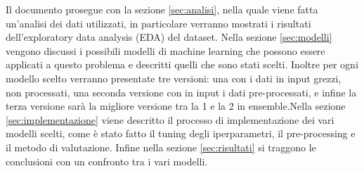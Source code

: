Il documento prosegue con la sezione \ref{sec:analisi}, nella quale viene fatta un'analisi dei dati utilizzati, in particolare verranno mostrati i risultati dell'exploratory data analysis (EDA) del dataset. Nella sezione \ref{sec:modelli} vengono discussi i possibili modelli di machine learning che possono essere applicati a questo problema e descritti quelli che sono stati scelti. Inoltre per ogni modello scelto verranno presentate tre versioni: una con i dati in input grezzi, non processati, una seconda versione con in input i dati pre-processati, e infine la terza versione sarà la migliore versione tra la 1 e la 2 in ensemble.Nella sezione \ref{sec:implementazione} viene descritto il processo di implementazione dei vari modelli scelti, come è stato fatto il tuning degli iperparametri, il pre-processing e il metodo di valutazione. Infine nella sezione \ref{sec:risultati} si traggono le conclusioni con un confronto tra i vari modelli.